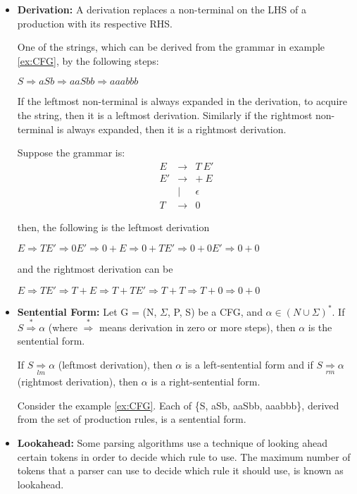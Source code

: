 \begin{itemize}
\item \textbf{Derivation:} A derivation replaces a non-terminal on the LHS of a production with its respective RHS.
\begin{example}
One of the strings, which can be derived from the grammar in example \ref{ex:CFG}, by the following steps:

$S \Rightarrow aSb \Rightarrow aaSbb \Rightarrow aaabbb$
\end{example}
If the leftmost non-terminal is always expanded in the derivation, to acquire the string, then it is a leftmost derivation. Similarly if  the rightmost non-terminal is always expanded, then it is a rightmost derivation.
\begin{example}
Suppose the grammar is:
\begin{eqnarray*}
E&\rightarrow& T\ E'\\
E'&\rightarrow& +\ E \\
  & \mid& \epsilon\\
T&\rightarrow&0
\end{eqnarray*}

then, the following is the leftmost derivation

$E \Rightarrow TE' \Rightarrow 0E' \Rightarrow 0+E \Rightarrow 0+TE' \Rightarrow 0+0E' \Rightarrow 0+0$

and the rightmost derivation can be

$E \Rightarrow TE' \Rightarrow T+E \Rightarrow T+TE' \Rightarrow T+T \Rightarrow T+0 \Rightarrow 0+0$
\end{example}

\item \textbf{Sentential Form:} Let G = (N, $\Sigma$, P, S) be a CFG, and $\alpha\in(N\cup\Sigma)^*$. If $S\overset{*}{\Rightarrow}\alpha$ (where $\overset{*}{\Rightarrow}$ means derivation in zero or more steps), then $\alpha$ is the sentential form.

If $S\underset{lm}{\Rightarrow}\alpha$ (leftmost derivation), then $\alpha$ is a left-sentential form and if $S\underset{rm}{\Rightarrow}\alpha$ (rightmost derivation), then $\alpha$ is a right-sentential form.
\begin{example}
Consider the example \ref{ex:CFG}. Each of \{S, aSb, aaSbb, aaabbb\}, derived from the set of production rules, is a sentential form.
\end{example}

\item \textbf{Lookahead:} Some parsing algorithms use a technique of looking ahead certain tokens in order to decide which rule to use. The maximum number of tokens that a parser can use to decide which rule it should use, is known as lookahead. %


\end{itemize}
